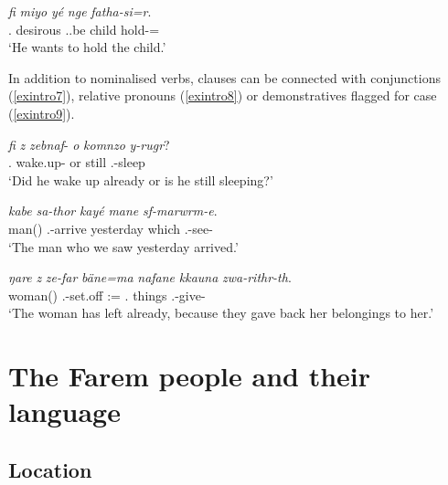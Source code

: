 \begin{exe}
	\ex
	\gll \emph{fi} \emph{miyo} \emph{yé} \emph{nge} \emph{fatha-si=r}.\\
	\Third.{\Abs} desirous \Tsg.\Masc.be child hold-\Nmlz={\Purp}\\
	\trans `He wants to hold the child.'
	\label{exintro6}
\end{exe}

In addition to nominalised verbs, clauses can be connected with conjunctions (\ref{exintro7}), relative pronouns (\ref{exintro8}) or demonstratives flagged for case (\ref{exintro9}).

\begin{exe}
	\ex
	\gll \emph{fi} \emph{z} \emph{zebnaf}-\Zero{} \emph{o} \emph{komnzo} \emph{y-rugr}?\\
	\Third.{\Abs} {\Iam} wake.up-\Tsg{} or still \Tsg.\Masc-sleep\\
	\trans `Did he wake up already or is he still sleeping?'
	\label{exintro7}
\end{exe}

\begin{exe}
	\ex
	\gll \emph{kabe} \emph{sa-thor} \emph{kayé} \emph{mane} \emph{sf-marwrm-e}.\\
	man(\Abs) \Tsg.\Masc-arrive yesterday which \Tsg.\Masc-see-\Fpl\\
	\trans `The man who we saw yesterday arrived.'
	\label{exintro8}
\end{exe}

\begin{exe}
	\ex
	\gll \emph{ŋare} \emph{z} \emph{ze-far} \emph{bäne=ma} \emph{nafane} \emph{kkauna} \emph{zwa-rithr-th}.\\
	woman(\Abs) {\Iam} \Tsg.\F-set.off \Dem:\Med={\Char} \Tsg.{\Poss} things \Tsg.\F-give-\Tpl\\
	\trans `The woman has left already, because they gave back her belongings to her.'
	\label{exintro9}
\end{exe}

\section{The Farem people and their language}\label{faremlang}

\subsection{Location}\label{location}

